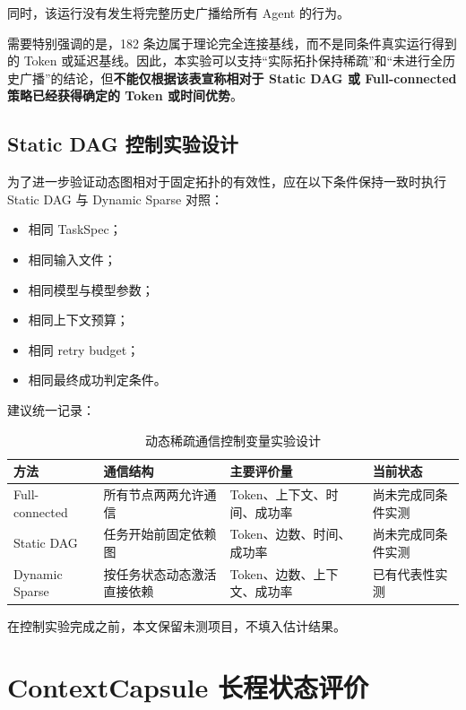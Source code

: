\documentclass[UTF8,a4paper,12pt,oneside]{ctexbook}
\begin{document}
同时，该运行没有发生将完整历史广播给所有 Agent 的行为。

需要特别强调的是，182 条边属于理论完全连接基线，而不是同条件真实运行得到的 Token 或延迟基线。因此，本实验可以支持“实际拓扑保持稀疏”和“未进行全历史广播”的结论，但\textbf{不能仅根据该表宣称相对于 Static DAG 或 Full-connected 策略已经获得确定的 Token 或时间优势}。


\subsection{Static DAG 控制实验设计}

为了进一步验证动态图相对于固定拓扑的有效性，应在以下条件保持一致时执行 Static DAG 与 Dynamic Sparse 对照：

\begin{itemize}
    \item 相同 TaskSpec；
    \item 相同输入文件；
    \item 相同模型与模型参数；
    \item 相同上下文预算；
    \item 相同 retry budget；
    \item 相同最终成功判定条件。
\end{itemize}

建议统一记录：

\begin{table}[htbp]
\centering
\caption{动态稀疏通信控制变量实验设计}
\label{tab:communication-ablation-design}
\begin{tabularx}{0.96\textwidth}{p{}X X X}
\toprule
方法 & 通信结构 & 主要评价量 & 当前状态\\
\midrule

Full-connected
& 所有节点两两允许通信
& Token、上下文、时间、成功率
& 尚未完成同条件实测\\

Static DAG
& 任务开始前固定依赖图
& Token、边数、时间、成功率
& 尚未完成同条件实测\\

Dynamic Sparse
& 按任务状态动态激活直接依赖
& Token、边数、上下文、成功率
& 已有代表性实测\\

\bottomrule
\end{tabularx}
\end{table}

在控制实验完成之前，本文保留未测项目，不填入估计结果。


\section{ContextCapsule 长程状态评价}
\end{document}
